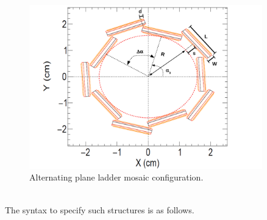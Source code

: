 \begin{figure}
  \centering
  \includegraphics[width=0.9\textwidth]{figures/Alternating_Mosaic.pdf}
  \caption{Alternating plane ladder mosaic configuration.}
  \label{fig:Alternating_Plane_ladder_mosaic}
\end{figure}

~\\
The syntax to specify such structures is as follows.


